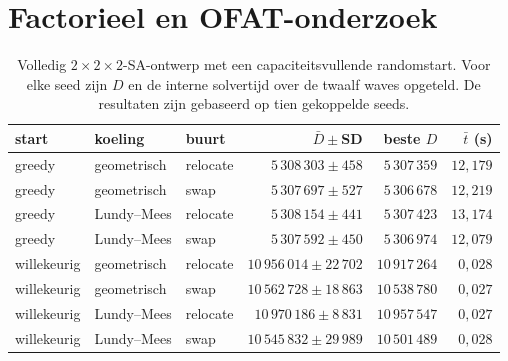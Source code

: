\section{Factorieel en OFAT-onderzoek}
\label{app:meta}

\begingroup
\footnotesize
\setlength{\tabcolsep}{2.5pt}
\setlength{\intextsep}{5pt}
\setlength{\abovecaptionskip}{3pt}
\setlength{\belowcaptionskip}{2pt}
\renewcommand{\arraystretch}{0.96}

\begin{table}[H]
\centering
\caption{Volledig $2\times2\times2$-SA-ontwerp met een capaciteitsvullende
randomstart. Voor elke seed zijn $D$ en de interne solvertijd over de twaalf
waves opgeteld. De resultaten zijn gebaseerd op tien gekoppelde seeds.}
\label{tab:app-sa}
\begin{tabular}{@{}lllrrr@{}}
\toprule
\textbf{start} & \textbf{koeling} & \textbf{buurt} &
\textbf{$\bar D\pm$SD} & \textbf{beste $D$} & \textbf{$\bar t$ (s)} \\
\midrule
greedy & geometrisch & relocate & $5\,308\,303\pm458$ & $5\,307\,359$ & $12,179$ \\
greedy & geometrisch & swap     & $5\,307\,697\pm527$ & $5\,306\,678$ & $12,219$ \\
greedy & Lundy--Mees & relocate & $5\,308\,154\pm441$ & $5\,307\,423$ & $13,174$ \\
greedy & Lundy--Mees & swap     & $5\,307\,592\pm450$ & $5\,306\,974$ & $12,079$ \\
\midrule
willekeurig & geometrisch & relocate & $10\,956\,014\pm22\,702$ & $10\,917\,264$ & $0,028$ \\
willekeurig & geometrisch & swap     & $10\,562\,728\pm18\,863$ & $10\,538\,780$ & $0,027$ \\
willekeurig & Lundy--Mees & relocate & $10\,970\,186\pm8\,831$  & $10\,957\,547$ & $0,027$ \\
willekeurig & Lundy--Mees & swap     & $10\,545\,832\pm29\,989$ & $10\,501\,489$ & $0,028$ \\
\bottomrule
\end{tabular}
\end{table}

